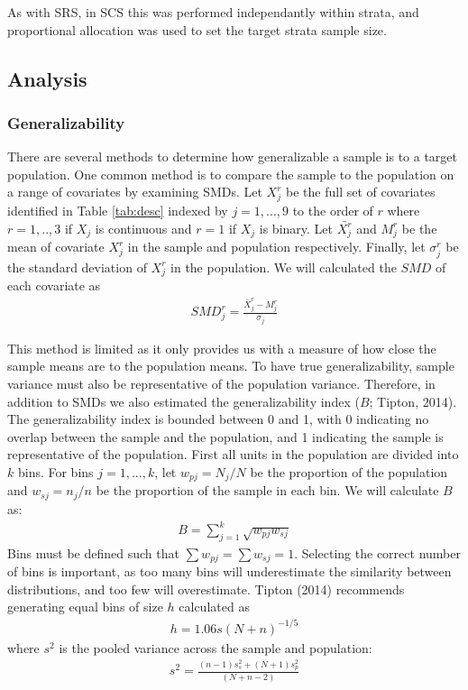 \documentclass[man,floatsintext]{apa6}
\begin{document}
As with SRS, in SCS this was performed independantly within strata, and proportional allocation was used to set the target strata sample size.

\hypertarget{analysis}{%
\subsection{Analysis}\label{analysis}}

\hypertarget{generalizability}{%
\subsubsection{Generalizability}\label{generalizability}}

There are several methods to determine how generalizable a sample is to a target population. One common method is to compare the sample to the population on a range of covariates by examining SMDs. Let \(X^r_j\) be the full set of covariates identified in Table \ref{tab:desc} indexed by \(j = 1,...,9\) to the order of \(r\) where \(r = 1,..,3\) if \(X_j\) is continuous and \(r = 1\) if \(X_j\) is binary. Let \(\bar{X^r_j}\) and \(M^r_j\) be the mean of covariate \(X^r_j\) in the sample and population respectively. Finally, let \(\sigma^r_j\) be the standard deviation of \(X^r_j\) in the population. We will calculated the \(SMD\) of each covariate as
\begin{align}
  SMD^r_{j} = \frac{\bar{X}^{r}_{j}-M^{r}_{j}}{\sigma_{j}}
\end{align}

This method is limited as it only provides us with a measure of how close the sample means are to the population means. To have true generalizability, sample variance must also be representative of the population variance. Therefore, in addition to SMDs we also estimated the generalizability index (\(B\); Tipton, 2014). The generalizability index is bounded between 0 and 1, with 0 indicating no overlap between the sample and the population, and 1 indicating the sample is representative of the population. First all units in the population are divided into \(k\) bins. For bins \(j = 1,...,k\), let \(w_{pj} = N_j/N\) be the proportion of the population and \(w_{sj} = n_j/n\) be the proportion of the sample in each bin. We will calculate \(B\) as:
\begin{align}
  B = \sum^k_{j=1}\sqrt{w_{pj}w_{sj}}
\end{align}
Bins must be defined such that \(\sum{w_{pj}} = \sum{w_{sj}} = 1\). Selecting the correct number of bins is important, as too many bins will underestimate the similarity between distributions, and too few will overestimate. Tipton (2014) recommends generating equal bins of size \(h\) calculated as
\begin{align}
  h = 1.06s(N+n)^{-1/5}
\end{align}
where \(s^2\) is the pooled variance across the sample and population:
\begin{align}
  s^2 = \frac{(n - 1)s^2_s + (N + 1)s^2_p}{(N + n - 2)}
\end{align}
\end{document}
